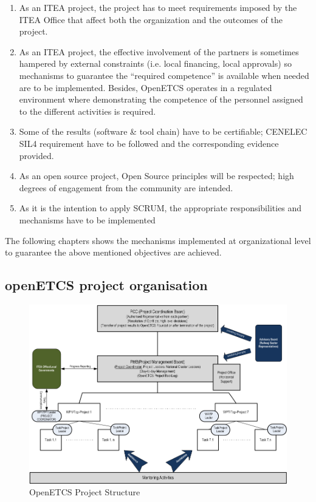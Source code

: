 \documentclass{template/openetcs_article}
\begin{document}
\begin{enumerate}
\item As an ITEA project, the project has to meet requirements imposed by the ITEA Office that affect both the organization and the outcomes of the project.
\item As an ITEA project, the effective involvement of the partners is sometimes hampered by external constraints (i.e. local financing, local approvals) so mechanisms to guarantee the “required competence” is available when needed are to be implemented. Besides, OpenETCS operates in a regulated environment where demonstrating the competence of the personnel assigned to the different activities is required. 
\item Some of the results (software \& tool chain) have to be certifiable; CENELEC SIL4 requirement \citep{subset026} have to be followed and the corresponding evidence provided. 
\item As an open source project, Open Source principles will be respected; high degrees of engagement from the community are intended.
\item As it is the intention to apply SCRUM, the appropriate responsibilities and mechanisms have to be implemented
\end{enumerate}

The following chapters shows the mechanisms implemented at organizational level to guarantee the above mentioned objectives are achieved.


\subsection{openETCS project organisation}

\begin{figure}[H]
\centering
\includegraphics[scale=0.6]{./figures/project_structure.PNG}
\caption{OpenETCS Project Structure}
\end{figure}
\end{document}
